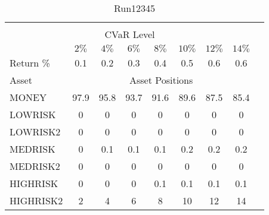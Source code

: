 \begin{table}[h!t]
\caption{Run12345}
\centering
\begin{tabular}[t]{ l c c c c c c c c }
\hline\hline \\
\multicolumn{8}{c}{CVaR Level} \\
 & $2\%$ & $4\%$ & $6\%$ & $8\%$ & $10\%$ & $12\%$ & $14\%$ \\[0.5ex]
Return \% &0.1 &0.2 &0.3 &0.4 &0.5 &0.6 &0.6\\[0.5ex]
Asset & \multicolumn{7}{c}{Asset Positions} \\[1ex]
MONEY & 97.9 & 95.8 & 93.7 & 91.6 & 89.6 & 87.5 & 85.4\\
LOWRISK & 0 & 0 & 0 & 0 & 0 & 0 & 0\\
LOWRISK2 & 0 & 0 & 0 & 0 & 0 & 0 & 0\\
MEDRISK & 0 & 0.1 & 0.1 & 0.1 & 0.2 & 0.2 & 0.2\\
MEDRISK2 & 0 & 0 & 0 & 0 & 0 & 0 & 0\\
HIGHRISK & 0 & 0 & 0 & 0.1 & 0.1 & 0.1 & 0.1\\
HIGHRISK2 & 2 & 4 & 6 & 8 & 10 & 12 & 14\\
[1ex] \hline
\end{tabular}
\end{table} 